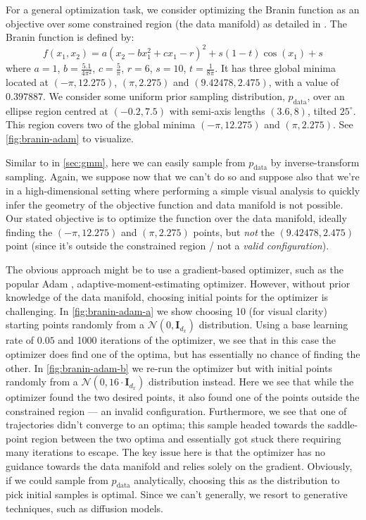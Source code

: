 For a general optimization task, we consider optimizing the Branin function as an objective over
some constrained region (the data manifold) as detailed in
\textcite{kongDiffusionModelsConstrained2024}. The Branin function is defined by:
\begin{equation}
    f(x_1, x_2) = a(x_2 - bx_1^2 + cx_1 - r)^2 + s(1-t)\cos(x_1) + s \label{eq:branin}
\end{equation}
where $a=1$, $b = \frac{5.1}{4\pi^2}$, $c=\frac{5}{\pi}$, $r=6$, $s=10$, $t=\frac{1}{8\pi}$.
It has three global minima located at $(-\pi, 12.275)$, $(\pi, 2.275)$ and $(9.42478, 2.475)$,
with a value of $0.397887$. We consider some uniform prior sampling distribution, $p_{\text{data}}$,
over an ellipse region centred at $(-0.2, 7.5)$ with semi-axis lengths $(3.6, 8)$, tilted
$25^\circ$. This region covers two of the global minima $(-\pi, 12.275)$ and $(\pi, 2.275)$.
See \autoref{fig:branin-adam} to visualize.

Similar to in \autoref{sec:gmm}, here we can easily sample from $p_{\text{data}}$ by inverse-transform
sampling. Again, we suppose now that we can't do so and suppose also that we're in a high-dimensional
setting where performing a simple visual analysis to quickly infer the geometry of the objective
function and data manifold is not possible. Our stated objective is to optimize the function over
the data manifold, ideally finding the $(-\pi, 12.275)$ and $(\pi, 2.275)$ points, but \emph{not}
the $(9.42478, 2.475)$ point (since it's outside the constrained region / not a \emph{valid
configuration}).

The obvious approach might be to use a gradient-based optimizer, such as the popular
Adam \parencite{kingmaAdamMethodStochastic2017}, adaptive-moment-estimating optimizer. However,
without prior knowledge of the data manifold, choosing initial points for the optimizer is
challenging. In \autoref{fig:branin-adam-a} we show choosing 10 (for visual clarity) starting points
randomly from a $\mathcal{N}(0, \mathbf{I}_{d_x})$ distribution. Using a base learning rate of
$0.05$ and 1000 iterations of the optimizer, we see that in this case the optimizer does find one of
the optima, but has essentially no chance of finding the other. In \autoref{fig:branin-adam-b} we re-run
the optimizer but with initial points randomly from a $\mathcal{N}(0, 16\cdot\mathbf{I}_{d_x})$
distribution instead. Here we see that while the optimizer found the two desired points, it also found
one of the points outside the constrained region --- an invalid configuration. Furthermore, we see
that one of trajectories didn't converge to an optima; this sample headed towards the saddle-point
region between the two optima and essentially got stuck there requiring many iterations to escape.
The key issue here is that the optimizer has no guidance towards the data manifold and relies solely
on the gradient. Obviously, if we could sample from $p_{\text{data}}$ analytically, choosing this as
the distribution to pick initial samples is optimal. Since we can't generally, we resort to
generative techniques, such as diffusion models.

